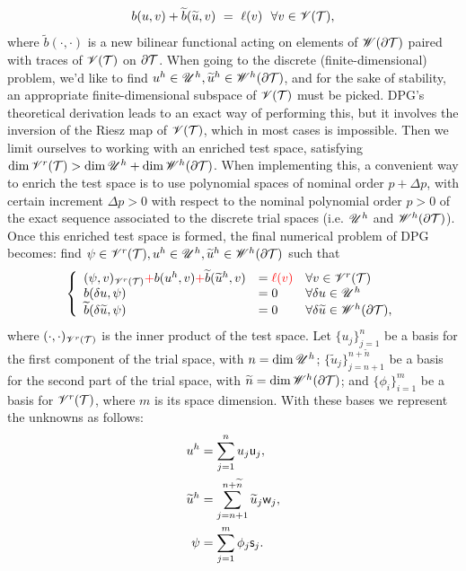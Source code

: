 % 
\begin{equation}
    b(u,v)+\widetilde{b}(\widetilde{u},v)\ =\ \ell(v)\ \ \forall v\in\mathscr{V}(\mathcal{T}),
\label{brokenvar}
\end{equation}
% 
where $\tilde{b}(\cdot,\cdot)$ is a new bilinear functional acting on elements of $\mathscr{W}(\partial\mathcal{T})$ paired with traces of $\mathscr{V}(\mathcal{T})$ on $\partial\mathcal{T}$. When going to the discrete (finite-dimensional) problem, we'd like to find $u^h\in\mathscr{U}^h, \widetilde{u}^h\in\mathscr{W}^h(\partial\mathcal{T})$, and for the sake of stability, an appropriate finite-dimensional subspace of $\mathscr{V}(\mathcal{T})$ must be picked. DPG's theoretical derivation leads to an exact way of performing this, but it involves the inversion of the Riesz map of $\mathscr{V}(\mathcal{T})$, which in most cases is impossible. Then we limit ourselves to working with an enriched test space, satisfying $\operatorname*{dim} \mathscr{V}^r(\mathcal{T})>\operatorname*{dim} \mathscr{U}^h+\operatorname*{dim}\mathscr{W}^h(\partial\mathcal{T})$. When implementing this, a convenient way to enrich the test space is to use polynomial spaces of nominal order $p+\Delta p$, with certain increment $\Delta p>0$ with respect to the nominal polynomial order $p>0$ of the exact sequence associated to the discrete trial spaces (i.e. $\mathscr{U}^h$ and $\mathscr{W}^h(\partial\mathcal{T})$). Once this enriched test space is formed, the final numerical problem of DPG becomes: find $\psi\in\mathscr{V}^r(\mathcal{T}),u^h\in\mathscr{U}^h, \widetilde{u}^h\in\mathscr{W}^h(\partial\mathcal{T})$ such that
%
\begin{equation}
\left\{
\begin{array}{lll}
    (\psi,v)_{\mathscr{V}^r(\mathcal{T})}{\color{red}+}b(u^h,v){\color{red}+} \widetilde{b}(\widetilde{u}^h,v)&={\color{red}\ell(v)}&\forall v\in\mathscr{V}^r(\mathcal{T})\\
    b(\delta u,\psi)&=0&\forall \delta u\in\mathscr{U}^h\\
    \widetilde{b}(\delta \widetilde{u},\psi)&=0&\forall \delta \widetilde{u}\in\mathscr{W}^h(\partial\mathcal{T}),
\end{array}\right.
\label{dpg_discrete1}
\end{equation}
%
where $(\cdot,\cdot)_{\mathscr{V}^r(\mathcal{T})}$ is the inner product of the test space. Let $\{u_j\}_{j=1}^n$ be a basis for the first component of the trial space, with $n=\operatorname*{dim} \mathscr{U}^h$; $\{\tilde{u}_j\}_{j=n+1}^{n+\tilde{n}}$ be a basis for the second part of the trial space, with $\widetilde{n}=\operatorname*{dim}\mathscr{W}^h(\partial\mathcal{T})$; and $\{\phi_i\}_{i=1}^m$ be a basis for $\mathscr{V}^r(\mathcal{T})$, where $m$ is its space dimension. With these bases we represent the unknowns as follows:
%
\begin{align}
    u^h&=\sum\limits_{j=1}^n u_j\mathsf{u}_j,\label{uhsum}\\
    \widetilde{u}^h&=\sum\limits_{j=n+1}^{n+\widetilde{n}} \widetilde{u}_j\mathsf{w}_j,\label{whsum}\\
    \psi&=\sum\limits_{j=1}^m \phi_j\mathsf{s}_j.\label{psirsum}
\end{align}

